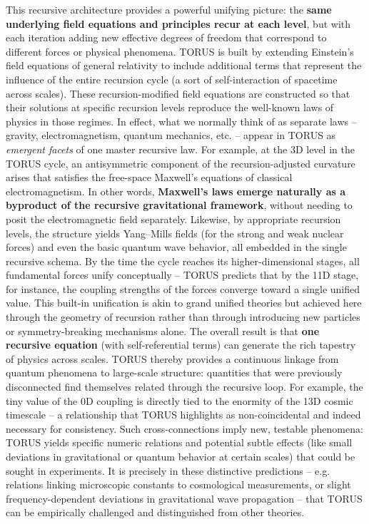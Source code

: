 \documentclass[
]{article}
\begin{document}
This recursive architecture provides a powerful unifying picture: the
\textbf{same underlying field equations and principles recur at each
level}, but with each iteration adding new effective degrees of freedom
that correspond to different forces or physical phenomena. TORUS is
built by extending Einstein's field equations of general relativity to
include additional terms that represent the influence of the entire
recursion cycle (a sort of self-interaction of spacetime across
scales)\hspace{0pt}. These recursion-modified field equations are
constructed so that their solutions at specific recursion levels
reproduce the well-known laws of physics in those regimes. In effect,
what we normally think of as separate laws -- gravity, electromagnetism,
quantum mechanics, etc. -- appear in TORUS as \emph{emergent facets} of
one master recursive law. For example, at the 3D level in the TORUS
cycle, an antisymmetric component of the recursion-adjusted curvature
arises that satisfies the free-space Maxwell's equations of classical
electromagnetism\hspace{0pt}. In other words, \textbf{Maxwell's laws
emerge naturally as a byproduct of the recursive gravitational
framework}, without needing to posit the electromagnetic field
separately\hspace{0pt}. Likewise, by appropriate recursion levels, the
structure yields Yang--Mills fields (for the strong and weak nuclear
forces) and even the basic quantum wave behavior, all embedded in the
single recursive schema. By the time the cycle reaches its
higher-dimensional stages, all fundamental forces unify conceptually --
TORUS predicts that by the 11D stage, for instance, the coupling
strengths of the forces converge toward a single unified
value\hspace{0pt}. This built-in unification is akin to grand unified
theories but achieved here through the geometry of recursion rather than
through introducing new particles or symmetry-breaking mechanisms alone.
The overall result is that \textbf{one recursive equation} (with
self-referential terms) can generate the rich tapestry of physics across
scales. TORUS thereby provides a continuous linkage from quantum
phenomena to large-scale structure: quantities that were previously
disconnected find themselves related through the recursive loop. For
example, the tiny value of the 0D coupling \alpha is directly tied to the
enormity of the 13D cosmic timescale -- a relationship that TORUS
highlights as non-coincidental and indeed necessary for
consistency\hspace{0pt}. Such cross-connections imply new, testable
phenomena: TORUS yields specific numeric relations and potential subtle
effects (like small deviations in gravitational or quantum behavior at
certain scales) that could be sought in experiments\hspace{0pt}. It is
precisely in these distinctive predictions -- e.g. relations linking
microscopic constants to cosmological measurements\hspace{0pt}, or
slight frequency-dependent deviations in gravitational wave propagation
-- that TORUS can be empirically challenged and distinguished from other
theories.
\end{document}
